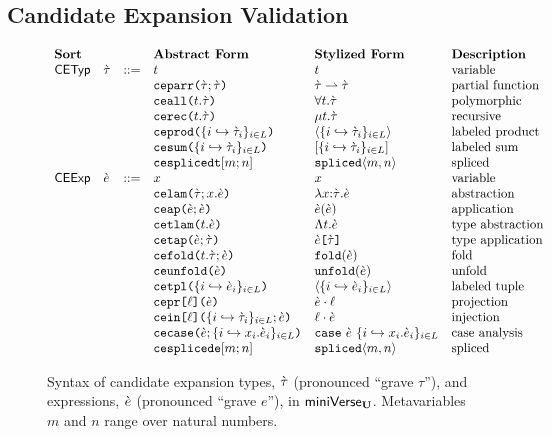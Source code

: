 \subsection{Candidate Expansion Validation}
\begin{figure}
$\begin{array}{lllllll}
\textbf{Sort} & & & \textbf{Abstract Form} & \textbf{Stylized Form} & \textbf{Description}\\
\mathsf{CETyp} & \grave{\tau} & ::= & t & t & \text{variable}\\
&&& \texttt{ceparr}\texttt{(}\grave{\tau}; \grave{\tau}\texttt{)} & \grave{\tau} \rightharpoonup \grave{\tau} & \text{partial function}\\
&&& \texttt{ceall}\texttt{(}t.\grave{\tau}\texttt{)} & \forall t.\grave{\tau} & \text{polymorphic}\\
&&& \texttt{cerec}\texttt{(}t.\grave{\tau}\texttt{)} & \mu t.\grave{\tau} & \text{recursive}\\
&&& \texttt{ceprod}\texttt{(}\{i \hookrightarrow \grave{\tau}_{i}\}_{i \in L}\texttt{)} & \langle \{i \hookrightarrow \grave{\tau}_{i}\}_{i \in L} \rangle & \text{labeled product}\\
&&& \texttt{cesum}\texttt{(}\{i \hookrightarrow \grave{\tau}_{i}\}_{i \in L}\texttt{)} & [\{i \hookrightarrow \grave{\tau}_{i}\}_{i \in L}] & \text{labeled sum}\\
&&& \texttt{cesplicedt}[m; n] & \texttt{spliced}\langle m, n\rangle & \text{spliced}\\
\mathsf{CEExp} & \grave{e} & ::= & x & x & \text{variable}\\
&&& \texttt{celam}\texttt{(}\grave{\tau}; x.\grave{e}\texttt{)} & \lambda x{:}\grave{\tau}.\grave{e} & \text{abstraction}\\
&&& \texttt{ceap}\texttt{(}\grave{e}; \grave{e}\texttt{)} & \grave{e}(\grave{e}) & \text{application}\\
&&& \texttt{cetlam}\texttt{(}t.\grave{e}\texttt{)} & \Lambda t.\grave{e} & \text{type abstraction}\\
&&& \texttt{cetap}\texttt{(}\grave{e}; \grave{\tau}\texttt{)} & \grave{e}\texttt{[}\grave{\tau}\texttt{]} & \text{type application}\\
&&& \texttt{cefold}\texttt{(}t.\grave{\tau}; \grave{e}\texttt{)} & \texttt{fold}(\grave{e}) & \text{fold}\\
&&& \texttt{ceunfold}\texttt{(}\grave{e}\texttt{)} & \texttt{unfold}(\grave{e}) & \text{unfold}\\
&&& \texttt{cetpl}\texttt{(}\{i \hookrightarrow \grave{e}_{i}\}_{i \in L}\texttt{)} & \langle \{i \hookrightarrow \grave{e}_{i}\}_{i \in L}\rangle & \text{labeled tuple}\\
&&& \texttt{cepr}\texttt{[}\ell\texttt{](}\grave{e}\texttt{)} & \grave{e} \cdot \ell & \text{projection}\\
&&& \texttt{cein}\texttt{[}\ell\texttt{](}\{i \hookrightarrow \grave{\tau}_{i}\}_{i \in L}; \grave{e}\texttt{)} & \ell \cdot \grave{e} & \text{injection}\\
&&& \texttt{cecase}\texttt{(}\grave{e}; \{i \hookrightarrow x_{i}.\grave{e}_{i}\}_{i \in L}\texttt{)} & \texttt{case}~\grave{e}~\{i \hookrightarrow x_{i}.\grave{e}_{i}\}_{i \in L} & \text{case analysis}\\
&&& \texttt{cesplicede}[m; n] & \texttt{spliced}\langle m, n\rangle & \text{spliced}
\end{array}$
\caption[Syntax of candidate expansion types and expressions in $\miniVerseU$.]{Syntax of candidate expansion types, $\grave{\tau}$ (pronounced ``grave $\tau$''), and expressions, $\grave{e}$ (pronounced ``grave $e$''), in $\miniVerseU$. Metavariables $m$ and $n$ range over natural numbers.}
\label{fig:U-candidate-terms}
\end{figure}

